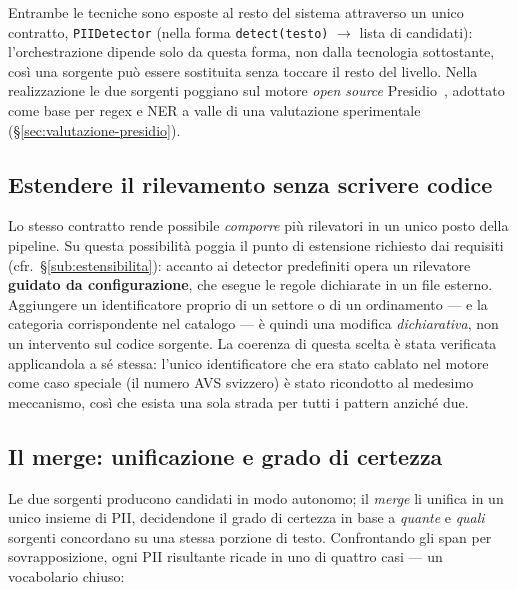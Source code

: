 Entrambe le tecniche sono esposte al resto del sistema attraverso un unico contratto, \texttt{PIIDetector} (nella forma \texttt{detect(testo)} $\rightarrow$ lista di candidati): l'orchestrazione dipende solo da questa forma, non dalla tecnologia sottostante, così una sorgente può essere sostituita senza toccare il resto del livello. Nella realizzazione le due sorgenti poggiano sul motore \textit{open source} Presidio~\cite{HomeMicrosoftPresidio}, adottato come base per regex e NER a valle di una valutazione sperimentale (§\ref{sec:valutazione-presidio}).

\subsection{Estendere il rilevamento senza scrivere codice} Lo stesso contratto rende possibile \emph{comporre} più rilevatori in un unico posto della pipeline. Su questa possibilità poggia il punto di estensione richiesto dai requisiti (cfr.~§\ref{sub:estensibilita}): accanto ai detector predefiniti opera un rilevatore \textbf{guidato da configurazione}, che esegue le regole dichiarate in un file esterno. Aggiungere un identificatore proprio di un settore o di un ordinamento --- e la categoria corrispondente nel catalogo --- è quindi una modifica \emph{dichiarativa}, non un intervento sul codice sorgente. La coerenza di questa scelta è stata verificata applicandola a sé stessa: l'unico identificatore che era stato cablato nel motore come caso speciale (il numero AVS svizzero) è stato ricondotto al medesimo meccanismo, così che esista una sola strada per tutti i pattern anziché due.

\subsection{Il merge: unificazione e grado di certezza}
\label{sub:b4-merge}

Le due sorgenti producono candidati in modo autonomo; il \emph{merge} li unifica in un unico insieme di PII, decidendone il grado di certezza in base a \emph{quante} e \emph{quali} sorgenti concordano su una stessa porzione di testo. Confrontando gli span per sovrapposizione, ogni PII risultante ricade in uno di quattro casi --- un vocabolario chiuso:

